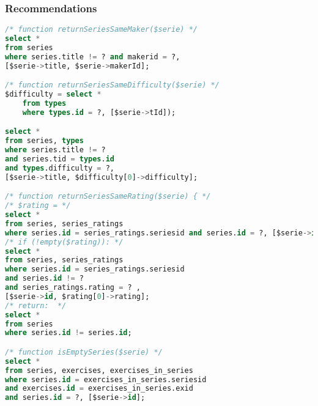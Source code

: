 \subsubsection{Recommendations}
\begin{lstlisting}[language=sql]
/* function returnSeriesSameMaker($serie) */
select *
from series
where series.title != ? and makerid = ?,
[$serie->title, $serie->makerId];

/* function returnSeriesSameDifficulty($serie) */
$difficulty = select *
    from types
    where types.id = ?, [$serie->tId]);

select *
from series, types
where series.title != ? 
and series.tid = types.id 
and types.difficulty = ?,
[$serie->title, $difficulty[0]->difficulty];

/* function returnSeriesSameRating($serie) { */
/* $rating = */
select *
from series, series_ratings
where series.id = series_ratings.seriesid and series.id = ?, [$serie->id];
/* if (!empty($rating)): */
select *
from series, series_ratings 
where series.id = series_ratings.seriesid 
and series.id != ?
and series_ratings.rating = ? ,
[$serie->id, $rating[0]->rating]; 
/* return:  */
select *
from series
where series.id != series.id;

/* function isEmptySeries($serie) */
select * 
from series, exercises, exercises_in_series
where series.id = exercises_in_series.seriesid
and exercises.id = exercises_in_series.exid
and series.id = ?, [$serie->id];

\end{lstlisting}
